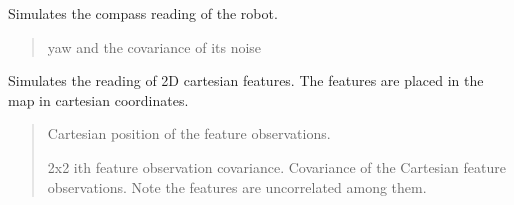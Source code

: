 \documentclass[letterpaper,10pt,english]{sphinxmanual}
\begin{document}
\begin{fulllineitems}
\begin{fulllineitems}
\begin{quote}
\begin{description}
\end{description}\end{quote}

\end{fulllineitems}


\begin{fulllineitems}
\label{\detokenize{robot_simulation:DifferentialDriveSimulatedRobot.DifferentialDriveSimulatedRobot.ReadCompass}}
\pysigstartsignatures
{}
\pysigstopsignatures
\sphinxAtStartPar
Simulates the compass reading of the robot.
\begin{quote}\begin{description}
\sphinxAtStartPar
yaw and the covariance of its noise 

\end{description}\end{quote}

\end{fulllineitems}


\begin{fulllineitems}
\label{\detokenize{robot_simulation:DifferentialDriveSimulatedRobot.DifferentialDriveSimulatedRobot.ReadCartesian2DFeature}}
\pysigstartsignatures
{}
\pysigstopsignatures
\sphinxAtStartPar
Simulates the reading of 2D cartesian features. The features are placed in the map in cartesian coordinates.
\begin{quote}\begin{description}
\sphinxAtStartPar
\begin{description}
\sphinxAtStartPar
Cartesian position of the feature observations.

\sphinxAtStartPar
2x2 i\sphinxhyphen{}th feature observation covariance.
Covariance of the Cartesian feature observations. Note the features are uncorrelated among them.


\end{description}
\end{description}
\end{quote}
\end{fulllineitems}
\end{fulllineitems}
\end{document}
